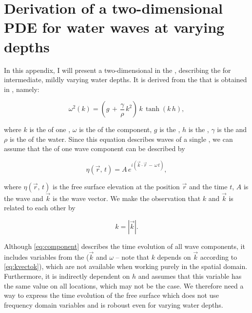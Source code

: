 \chapter{Derivation of a two-dimensional PDE for water waves at varying depths}

In this appendix, I will present a two-dimensional  in the , describing the  for intermediate, mildly varying water depths. It is derived from the  that is obtained in , namely:

\begin{equation} \label{eq:dispersion}
\omega^2(k) = \left(g\,+\,\frac{\gamma}{\rho}\,k^2\right)\,k\,\tanh(k\,h),
\end{equation}

where $k$ is the  of one , $\omega$ is the  of the component, $g$ is the , $h$ is the , $\gamma$ is the  and $\rho$ is the  of the water. Since this equation describes waves of a single , we can assume that the  of one wave component can be described by

\begin{equation} \label{eq:component}
\eta(\vec{r},\,t) = A\,e^{i(\vec{k}\cdot\vec{r}\,-\,\omega\,t)},
\end{equation}

where $\eta(\vec{r},\,t)$ is the free surface elevation at the position $\vec{r}$ and the time $t$, $A$ is the wave  and $\vec{k}$ is the wave vector. We make the observation that $k$ and $\vec{k}$ is related to each other by

\begin{equation} \label{eq:kvectok}
k = \left|\vec{k}\right|.
\end{equation}

Although \eqref{eq:component} describes the time evolution of all wave components, it includes variables from the  ($\vec{k}$ and $\omega$ -- note that $k$ depends on $\vec{k}$ according to \eqref{eq:kvectok}), which are not available when working purely in the spatial domain. Furthermore, it is indirectly dependent on $h$ and assumes that this variable has the same value on all locations, which may not be the case. We therefore need a way to express the time evolution of the free surface which does not use frequency domain variables and is roboust even for varying water depths.

